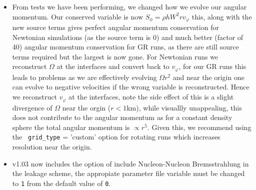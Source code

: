 \documentclass[10pt,nofootinbib]{article}
\newcommand{\code}[1]{\texttt{#1}}
\begin{document}
\begin{itemize}
\item From tests we have been performing, we changed how we evolve our
  angular momentum.  Our conserved variable is now $S_\phi = \rho h W^2
  r v_\varphi$ this, along with the new source terms gives perfect
  angular momentum conservation for Newtonian simulations (as the
  source term is 0) and much better (factor of 40) angular momentum
  conservation for GR runs, as there are still source terms required
  but the largest is now gone.  For Newtonian runs we reconstruct
  $\Omega$ at the interfaces and convert back to $v_\varphi$, for our
  GR runs this leads to problems as we are effectively evolving
  $\Omega r^2$ and near the origin one can evolve to negative
  velocities if the wrong variable is reconstructed.  Hence we
  reconstruct $v_\varphi$ at the interfaces, note the side effect of
  this is a slight divergence of $\Omega$ near the orgin ($r<1$km),
  while visuallly unappealing, this does not contribute to the angular
  momentum as for a constant density sphere the total angular momentum
  is $\propto r^5$. Given this, we recommend using the {\tt
    grid\_type} = 'custom' option for rotating runs which increases
  resolution near the origin.
\item v1.03 now includes the option of include Nucleon-Nucleon
  Bremsstrahlung in the leakage scheme, the appropiate parameter file
  variable must be changed to \code{1} from the default value of
  \code{0}.
\end{itemize}
\end{document}
